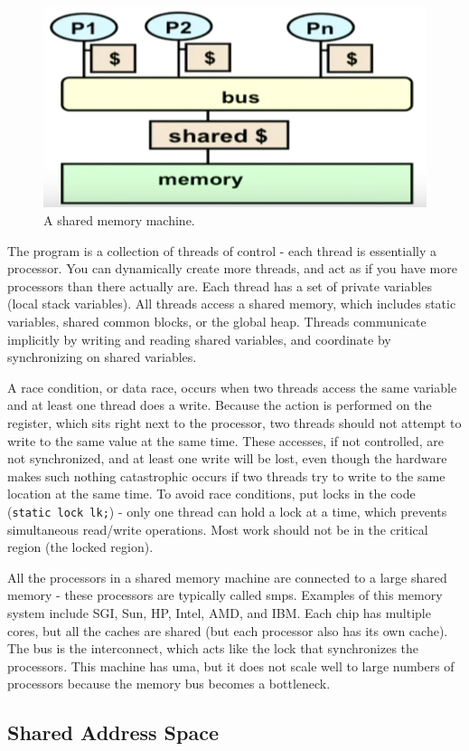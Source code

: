\documentclass[10pt]{article}
\begin{document}
\begin{flushleft}
\begin{figure}[H]
\centering
\includegraphics[width=0.5\linewidth]{figures/shared-memory.pdf}
\caption{A shared memory machine.}
\end{figure}

The program is a collection of threads of control - each thread is essentially a processor. You can dynamically create more threads, and act as if you have more processors than there actually are. Each thread has a set of private variables (local stack variables). All threads access a shared memory, which includes static variables, shared common blocks, or the global heap. Threads communicate implicitly by writing and reading shared variables, and coordinate by synchronizing on shared variables.

A race condition, or data race, occurs when two threads access the same variable and at least one thread does a write. Because the action is performed on the register, which sits right next to the processor, two threads should not attempt to write to the same value at the same time. These accesses, if not controlled, are not synchronized, and at least one write will be lost, even though the hardware makes such nothing catastrophic occurs if two threads try to write to the same location at the same time. To avoid race conditions, put locks in the code ({\tt static lock lk;}) - only one thread can hold a lock at a time, which prevents simultaneous read/write operations. Most work should not be in the critical region (the locked region).

All the processors in a shared memory machine are connected to a large shared memory - these processors are typically called \gls{smp}s. Examples of this memory system include SGI, Sun, HP, Intel, AMD, and IBM. Each chip has multiple cores, but all the caches are shared (but each processor also has its own cache). The bus is the interconnect, which acts like the lock that synchronizes the processors. This machine has \gls{uma}, but it does not scale well to large numbers of processors because the memory bus becomes a bottleneck.

\subsection{Shared Address Space}


\end{flushleft}
\end{document}
